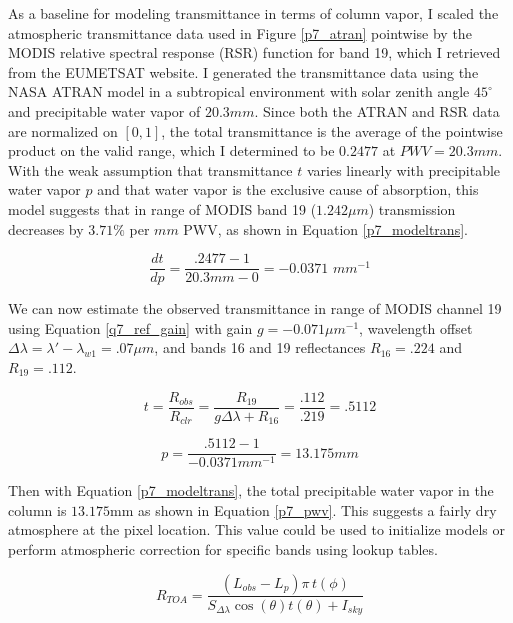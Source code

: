 \documentclass[12pt]{article}
\begin{document}
As a baseline for modeling transmittance in terms of column vapor, I scaled the atmospheric transmittance data used in Figure \ref{p7_atran} pointwise by the MODIS relative spectral response (RSR) function for band 19, which I retrieved from the EUMETSAT website. I generated the transmittance data using the NASA ATRAN model in a subtropical environment with solar zenith angle $45^\circ$ and precipitable water vapor of $20.3mm$. Since both the ATRAN and RSR data are normalized on $[0,1]$, the total transmittance is the average of the pointwise product on the valid range, which I determined to be $0.2477$ at $PWV=20.3mm$. With the weak assumption that transmittance $t$ varies linearly with precipitable water vapor $p$ and that water vapor is the exclusive cause of absorption, this model suggests that in range of MODIS band 19 ($1.242\mu m$) transmission decreases by $3.71\%$ per $mm$ PWV, as shown in Equation \ref{p7_modeltrans}.

\begin{equation}\label{p7_modeltrans}
    \frac{dt}{dp} = \frac{.2477-1}{20.3mm-0} = -0.0371\,\,mm^{-1}
\end{equation}

\clearpage

We can now estimate the observed transmittance in range of MODIS channel 19 using Equation \ref{q7_ref_gain} with gain $g=-0.071\mu m^{-1}$, wavelength offset $\Delta \lambda = \lambda'-\lambda_{w1} = .07\mu m$, and bands 16 and 19 reflectances $R_{16} = .224$ and $R_{19}=.112$.

\begin{equation}\label{p7_obsrans}
    t = \frac{R_{obs}}{R_{clr}} = \frac{R_{19}}{g\Delta\lambda + R_{16}} = \frac{.112}{.219} = .5112
\end{equation}

\begin{equation}\label{p7_pwv}
    p = \frac{.5112-1}{-0.0371mm^{-1}} = 13.175mm
\end{equation}

\noindent
Then with Equation \ref{p7_modeltrans}, the total precipitable water vapor in the column is $13.175$mm as shown in Equation \ref{p7_pwv}. This suggests a fairly dry atmosphere at the pixel location. This value could be used to initialize models or perform atmospheric correction for specific bands using lookup tables.

\begin{equation}\label{p7_atmocor}
    R_{TOA} = \frac{(L_{obs} - L_p)\pi\,t(\phi)}{S_{\Delta\lambda}\cos(\theta)t(\theta) + I_{sky}}
\end{equation}
\end{document}
